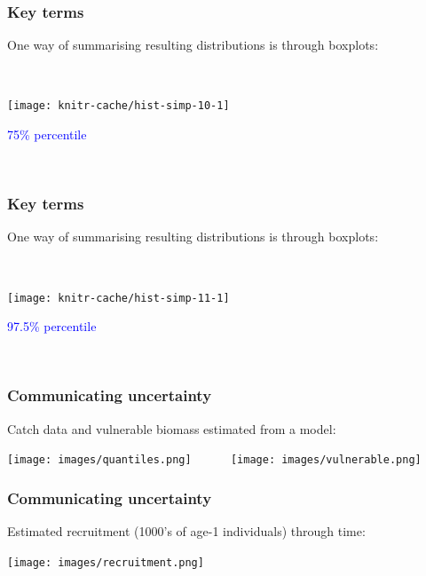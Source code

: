 
\begin{frame}
\frametitle{Key terms}

One way of summarising resulting distributions is through boxplots:

~\\

\begin{knitrout}
\color{fgcolor}
\texttt{[image: knitr-cache/hist-simp-10-1]}

\end{knitrout}
\textcolor{blue}{75\% percentile}  %

~\\

\end{frame}


\begin{frame}
\frametitle{Key terms}

One way of summarising resulting distributions is through boxplots:

~\\

\begin{knitrout}
\color{fgcolor}
\texttt{[image: knitr-cache/hist-simp-11-1]}

\end{knitrout}
\textcolor{blue}{97.5\% percentile}  %

~\\

\end{frame}


\begin{frame}
\frametitle{Communicating uncertainty}

Catch data and vulnerable biomass estimated from a model:

\centering
\texttt{[image: images/quantiles.png]}
~~~~~
\texttt{[image: images/vulnerable.png]}

\end{frame}


\begin{frame}
\frametitle{Communicating uncertainty}

Estimated recruitment (1000's of age-1 individuals) through time:

\centering
\texttt{[image: images/recruitment.png]}

\end{frame}

